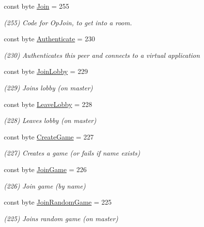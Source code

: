 \begin{DoxyCompactItemize}
\item 
const byte \hyperlink{class_exit_games_1_1_client_1_1_photon_1_1_operation_code_ab40167d42ef70df40f89864db5085c68}{Join} = 255
\begin{DoxyCompactList}\small\item\em (255) Code for Op\+Join, to get into a room.\end{DoxyCompactList}\item 
const byte \hyperlink{class_exit_games_1_1_client_1_1_photon_1_1_operation_code_a593c0164845113e55d36c4ab792620b9}{Authenticate} = 230
\begin{DoxyCompactList}\small\item\em (230) Authenticates this peer and connects to a virtual application\end{DoxyCompactList}\item 
const byte \hyperlink{class_exit_games_1_1_client_1_1_photon_1_1_operation_code_a160904b6b125f48aeee0a33f7745aa6b}{Join\+Lobby} = 229
\begin{DoxyCompactList}\small\item\em (229) Joins lobby (on master)\end{DoxyCompactList}\item 
const byte \hyperlink{class_exit_games_1_1_client_1_1_photon_1_1_operation_code_ac9483ca214470e195bd3b4558aee3a08}{Leave\+Lobby} = 228
\begin{DoxyCompactList}\small\item\em (228) Leaves lobby (on master)\end{DoxyCompactList}\item 
const byte \hyperlink{class_exit_games_1_1_client_1_1_photon_1_1_operation_code_a4ec87e6ee50ba49c669644c242053854}{Create\+Game} = 227
\begin{DoxyCompactList}\small\item\em (227) Creates a game (or fails if name exists)\end{DoxyCompactList}\item 
const byte \hyperlink{class_exit_games_1_1_client_1_1_photon_1_1_operation_code_a98972f7fc4a8965ef0597387b298bba2}{Join\+Game} = 226
\begin{DoxyCompactList}\small\item\em (226) Join game (by name)\end{DoxyCompactList}\item 
const byte \hyperlink{class_exit_games_1_1_client_1_1_photon_1_1_operation_code_a43219f5aad29ff41925811ef959dd442}{Join\+Random\+Game} = 225
\begin{DoxyCompactList}\small\item\em (225) Joins random game (on master)\end{DoxyCompactList}\item 

\end{DoxyCompactItemize}
